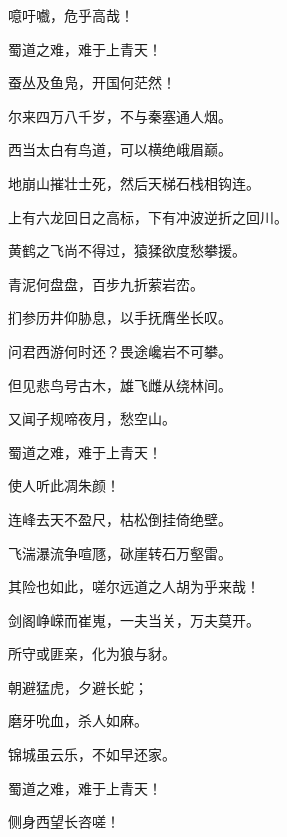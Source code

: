 \documentclass[12pt,UTF-8,openany,fontset=none]{ctexbook}
\begin{document}
\begin{center}
    \begin{Large}

        \hspace{16pt}噫吁嚱，危乎高哉！
        
        \hspace{16pt}蜀道之难，难于上青天！

        蚕丛及鱼凫，开国何茫然！

        尔来四万八千岁，不与秦塞通人烟。

        西当太白有鸟道，可以横绝峨眉巅。

        \hspace{34pt}地崩山摧壮士死，然后天梯石栈相钩连。

        上有六龙回日之高标，下有冲波逆折之回川。

        黄鹤之飞尚不得过，猿猱欲度愁攀援。

        \hspace{34pt}青泥何盘盘，百步九折萦岩峦。

        扪参历井仰胁息，以手抚膺坐长叹。

        问君西游何时还？畏途巉岩不可攀。

        但见悲鸟号古木，雄飞雌从绕林间。

        又闻子规啼夜月，愁空山。\hspace{58pt}

        \hspace{16pt}蜀道之难，难于上青天！
        
        使人听此凋朱颜！\phantom{日日日日日日日}\hspace{6pt}

        连峰去天不盈尺，枯松倒挂倚绝壁。

        飞湍瀑流争喧豗，砯崖转石万壑雷。

        其险也如此，嗟尔远道之人胡为乎来哉！

        剑阁峥嵘而崔嵬，一夫当关，万夫莫开。

        所守或匪亲，化为狼与豺。

        朝避猛虎，夕避长蛇；
        
        磨牙吮血，杀人如麻。

        锦城虽云乐，不如早还家。

        \hspace{16pt}蜀道之难，难于上青天！
        
        侧身西望长咨嗟！\phantom{日日日日日日日}\hspace{6pt}

    \end{Large}

\end{center}
\end{document}
